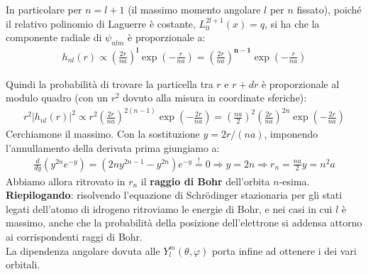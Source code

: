 \documentclass[../../FisicaTeorica.tex]{subfiles}
\begin{document}
In particolare per $n=l+1$ (il massimo momento angolare $l$ per $n$ fissato), poiché il relativo polinomio di Laguerre è costante, $L_0^{2l+1}(x)=q$, si ha che la componente radiale di $\psi_{nlm}$ è proporzionale a:
\begin{align*}
h_{nl}(r)\propto
\left(\frac{2r}{na}\right)^{\bm{l}} \exp\left({-\frac{r}{na}}\right) = \left(\frac{2r}{na}\right)^{\bm{n-1}} \exp\left(-\frac{r}{na}\right)
\end{align*}

Quindi la probabilità di trovare la particella tra $r$ e $r+dr$ è proporzionale al modulo quadro (con un $r^2$ dovuto alla misura in coordinate sferiche):
\begin{align*}
r^2|h_{nl}(r)|^2 \propto
r^2 \left(\frac{2r}{na}\right)^{2(n-1)}\exp\left(-\frac{2r}{na}\right) =\left(\frac{na}{2}\right)^2 \left(\frac{2r}{na}\right)^{2n} \exp\left(-\frac{2r}{na}\right)
\end{align*}
Cerchiamone il massimo. Con la sostituzione $y=2r/(na)$, imponendo l'annullamento della derivata prima giungiamo a:
\begin{align*}
\frac{d}{dy}\left( y^{2n} e^{-y} \right) = \left(
2n y^{2n-1} - y^{2n}
\right) e^{-y} \overset{!}{=} 0 \Rightarrow  y=2n \Rightarrow r_n = \frac{na}{2}y = n^2 a
\end{align*}
Abbiamo allora ritrovato in $r_n$ il \textbf{raggio di Bohr} dell'orbita $n$-esima.\\

\textbf{Riepilogando}: risolvendo l'equazione di Schr\"odinger stazionaria per gli stati legati dell'atomo di idrogeno ritroviamo le energie di Bohr, e nei casi in cui $l$ è massimo, anche che la probabilità della posizione dell'elettrone si addensa attorno ai corrispondenti raggi di Bohr.\\
La dipendenza angolare dovuta alle $Y^m_l(\theta,\varphi)$ porta infine ad ottenere i  dei vari orbitali.
\end{document}
